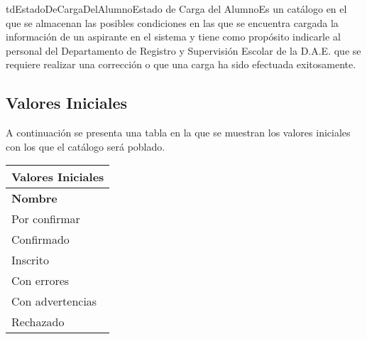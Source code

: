 \begin{TipoDeDato}{tdEstadoDeCargaDelAlumno}{Estado de Carga del Alumno}{Es un catálogo en el que se almacenan las posibles condiciones en las que se encuentra cargada la información de un aspirante en el sistema y tiene como propósito indicarle al personal del Departamento de Registro y Supervisión Escolar de la D.A.E. que se requiere realizar una corrección o que una carga ha sido efectuada exitosamente.}
	\begin{tdAtributos}
		
	
	\end{tdAtributos}

	\subsection{Valores Iniciales}
	
	A continuación se presenta una tabla en la que se muestran los valores iniciales con los que el catálogo será poblado. \cdtEmpty
		\begin{longtable}{|p{}|}
				\hline
				\rowcolor{colorPrincipal}
	 			\bf \color{white} Valores Iniciales\\
	 			\hline
	 			\rowcolor{colorSecundario}
	 			\bf\color{white}Nombre \\
	 			\hline
	 				Por confirmar \\
	 				\hline
	 				Confirmado\\
	 				\hline
	 				Inscrito\\
	 				\hline
	 				Con errores\\
	 				\hline
	 				Con advertencias\\
	 				\hline
	 				Rechazado\\
	 			\hline
		\end{longtable}

\end{TipoDeDato}


